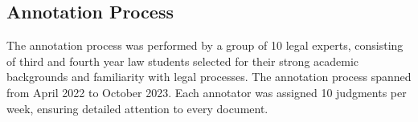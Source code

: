 


\subsection{Annotation Process}
The annotation process was performed by a group of 10 legal experts, consisting of third and fourth year law students selected for their strong academic backgrounds and familiarity with legal processes. The annotation process spanned from April 2022 to October 2023. Each annotator was assigned 10 judgments per week, ensuring detailed attention to every document.

